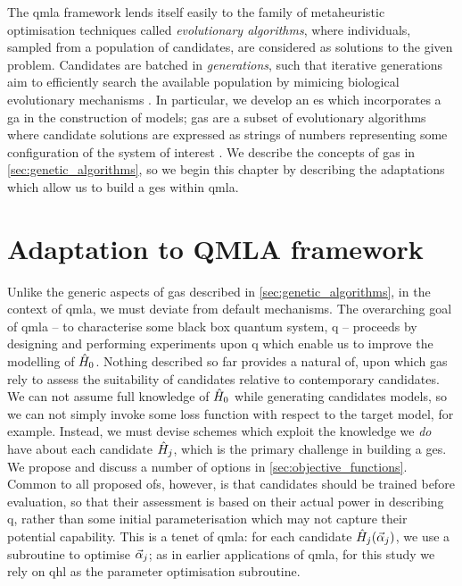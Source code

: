 The \gls{qmla} framework lends itself easily to the family of metaheuristic optimisation techniques 
    called \emph{evolutionary algorithms}, 
    where individuals, sampled from a population of candidates, are considered as solutions to the given problem.
Candidates are batched in \emph{generations},
    such that iterative generations aim to efficiently search the available population
    by mimicing biological evolutionary mechanisms \cite{back1996evolutionary}. 
In particular, we develop an \gls{es} which incorporates a \gls{ga} in the construction of models;
    \glspl{ga} are a subset of evolutionary algorithms where candidate solutions are expressed as 
    strings of numbers representing some configuration of the system of interest \cite{holland1992adaptation}.
We describe the concepts of \glspl{ga} in \cref{sec:genetic_algorithms}, 
    so we begin this chapter by describing the adaptations which allow us to build a \gls{ges} within \gls{qmla}. 
\par 

\section{Adaptation to QMLA framework}\label{sec:ga_adaptation_to_qmla}
Unlike the generic aspects of \glspl{ga} described in \cref{sec:genetic_algorithms}, 
    in the context of \gls{qmla}, we must deviate from default mechanisms. 
The overarching goal of \gls{qmla} --
    to characterise some black box quantum system, \gls{q} --
    proceeds by designing and performing \glspl{experiment} upon \gls{q} which enable us to improve 
    the modelling of $\hat{H}_0$. 
Nothing described so far provides a natural \gls{of}, upon which \glspl{ga} rely 
    to assess the suitability of candidates relative to contemporary candidates.
We can not assume full knowledge of $\hat{H}_0$ while generating candidates \glspl{model},
    so we can not simply invoke some loss function with respect to the target model, for example. 
Instead, we must devise schemes which exploit the knowledge we \emph{do} have about each candidate $\hat{H}_j$,
    which is the primary challenge in building a \gls{ges}.
We propose and discuss a number of options in \cref{sec:objective_functions}. 
Common to all proposed \glspl{of}, however, is that candidates should be trained before evaluation, 
    so that their assessment is based on their actual power in describing \gls{q},  
    rather than some initial parameterisation which may not capture their potential capability. 
This is a tenet of \gls{qmla}: for each candidate $\hat{H}_j ( \vec{\alpha}_j )$, we use a subroutine to optimise $\vec{\alpha}_j$;
    as in earlier applications of \gls{qmla}, for this study we rely on \gls{qhl} as the parameter optimisation subroutine. 
\par

